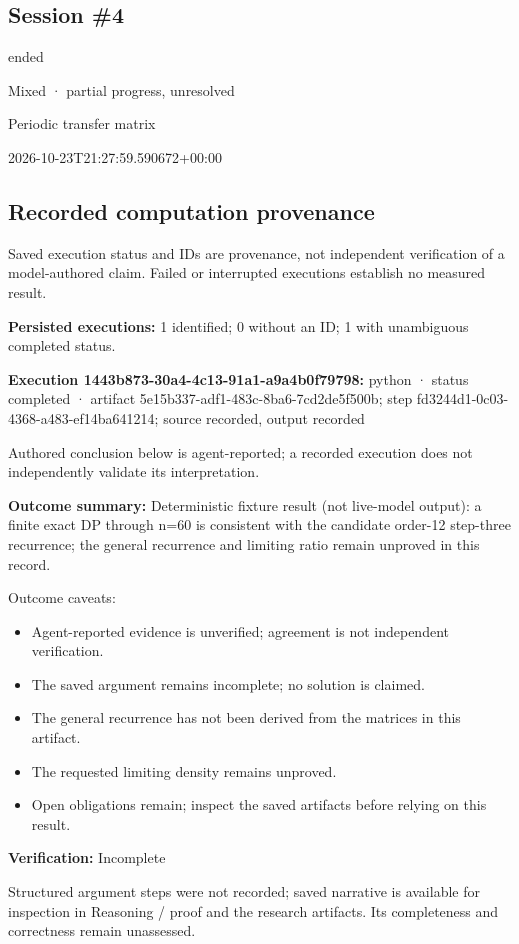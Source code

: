 \documentclass[11pt]{article}
\begin{document}
\subsection{Session \#4}
\begin{description}[style=nextline,font=\normalfont\bfseries,leftmargin=0pt,labelsep=0pt]
\item[Execution status] ended
\item[Outcome] Mixed · partial progress, unresolved
\item[Strategy] Periodic transfer matrix
\item[Started] 2026-10-23T21:27:59.590672+00:00
\end{description}
\subsection{Recorded computation provenance}
Saved execution status and IDs are provenance, not independent verification of a model-authored claim. Failed or interrupted executions establish no measured result.\par
\textbf{Persisted executions:} 1 identified; 0 without an ID; 1 with unambiguous completed status.\par
\textbf{Execution 1443b873-30a4-4c13-91a1-a9a4b0f79798:} python · status completed · artifact 5e15b337-adf1-483c-8ba6-7cd2de5f500b; step fd3244d1-0c03-4368-a483-ef14ba641214; source recorded, output recorded\par
Authored conclusion below is agent-reported; a recorded execution does not independently validate its interpretation.\par
\textbf{Outcome summary:} Deterministic fixture result (not live-model output): a finite exact DP through n=60 is consistent with the candidate order-12 step-three recurrence; the general recurrence and limiting ratio remain unproved in this record.\par
Outcome caveats:\par
\begin{itemize}
\item Agent-reported evidence is unverified; agreement is not independent verification.
\item The saved argument remains incomplete; no solution is claimed.
\item The general recurrence has not been derived from the matrices in this artifact.
\item The requested limiting density remains unproved.
\item Open obligations remain; inspect the saved artifacts before relying on this result.
\end{itemize}
\textbf{Verification:} Incomplete\par
Structured argument steps were not recorded; saved narrative is available for inspection in Reasoning / proof and the research artifacts. Its completeness and correctness remain unassessed.\par
\end{document}
